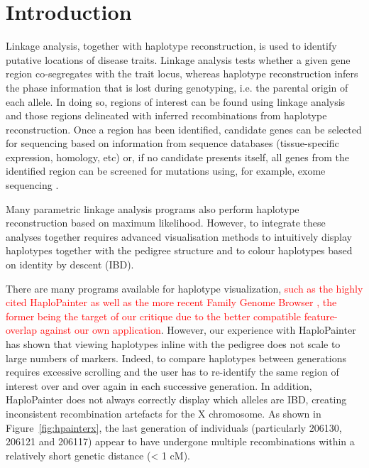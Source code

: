\documentclass{bioinfo}
\numberwithin{equation}{section}
\def\hpainter{{HaploPainter}}
\newcommand{\changes}[1]{\textcolor{red}{#1}}
\begin{document}
\maketitle

\section{Introduction}

\enlargethispage{15pt}
Linkage analysis, together with haplotype reconstruction, is used to identify putative locations of disease traits. Linkage analysis tests whether a given gene region co-segregates with the trait locus, whereas haplotype reconstruction infers the phase information that is lost during genotyping, i.e. the parental origin of each allele. In doing so, regions of interest can be found using linkage analysis and those regions delineated with inferred recombinations from haplotype reconstruction. Once a region has been identified, candidate genes can be selected for sequencing based on information from sequence databases (tissue-specific expression, homology, etc) or, if no candidate presents itself, all genes from the identified region can be screened for mutations using, for example, exome sequencing \citep{bockenhauer2012genetic}.

Many parametric linkage analysis programs also perform haplotype reconstruction based on maximum likelihood. However, to integrate these analyses together requires advanced visualisation methods to intuitively display haplotypes together with the pedigree structure and to colour haplotypes based on identity by descent (IBD).


There are many programs available for haplotype visualization, \changes{such as the highly cited \hpainter{} \citep{hpaint} as well as the more recent Family Genome Browser \citep{familygenomebrowser}, the former being the target of our critique due to the better compatible feature-overlap against our own application}. However, our experience with \hpainter{} has shown that viewing haplotypes inline with the pedigree does not scale to large numbers of markers. Indeed, to compare haplotypes between generations requires excessive scrolling and the user has to re-identify the same region of interest over and over again in each successive generation. In addition, \hpainter{} does not always correctly display which alleles are IBD, creating inconsistent recombination artefacts for the X chromosome. As shown in Figure~\ref{fig:hpainterx}, the last generation of individuals (particularly 206130, 206121 and 206117) appear to have undergone multiple recombinations within a relatively short genetic distance (< 1 cM).
\end{document}
